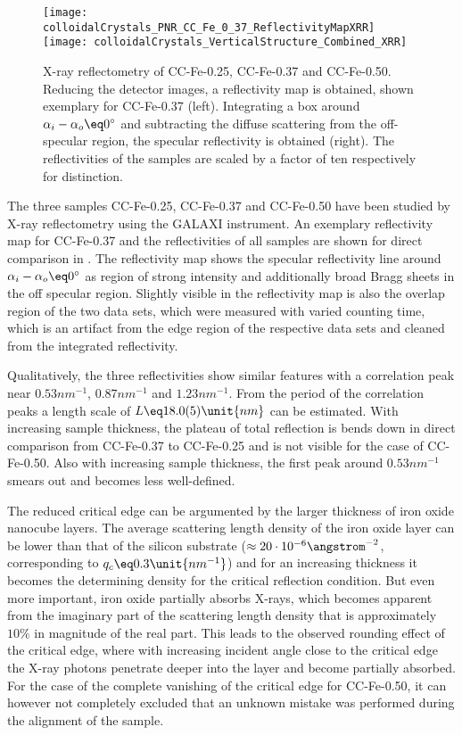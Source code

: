 \documentclass[\main/dresen_thesis.tex]{subfiles}
\begin{document}
  \label{sec:colloidalCrystals:layers:xrr}
  \begin{figure}[tb]
    \centering
    \texttt{[image: colloidalCrystals\_PNR\_CC\_Fe\_0\_37\_ReflectivityMapXRR]}
    \texttt{[image: colloidalCrystals\_VerticalStructure\_Combined\_XRR]}
    \caption{\label{fig:colloidalCrystals:xrr}X-ray reflectometry of CC-Fe-0.25, CC-Fe-0.37 and CC-Fe-0.50. Reducing the detector images, a reflectivity map is obtained, shown exemplary for CC-Fe-0.37 (left). Integrating a box around $\alpha_i - \alpha_o \eq 0 ^\circ$ and subtracting the diffuse scattering from the off-specular region, the specular reflectivity is obtained (right). The reflectivities of the samples are scaled by a factor of ten respectively for distinction.}
  \end{figure}

  The three samples CC-Fe-0.25, CC-Fe-0.37 and CC-Fe-0.50 have been studied by X-ray reflectometry using the GALAXI instrument.
  An exemplary reflectivity map for CC-Fe-0.37 and the reflectivities of all samples are shown for direct comparison in .
  The reflectivity map shows the specular reflectivity line around $\alpha_i - \alpha_o \eq 0 ^\circ$ as region of strong intensity and additionally broad Bragg sheets in the off specular region.
  Slightly visible in the reflectivity map is also the overlap region of the two data sets, which were measured with varied counting time, which is an artifact from the edge region of the respective data sets and cleaned from the integrated reflectivity.

  Qualitatively, the three reflectivities show similar features with a correlation peak near $0.53 \unit{nm^{-1}}$, $0.87 \unit{nm^{-1}}$ and $1.23 \unit{nm^{-1}}$.
  From the period of the correlation peaks a length scale of $L \eq 18.0(5) \unit{nm}$ can be estimated.
  With increasing sample thickness, the plateau of total reflection is bends down in direct comparison from CC-Fe-0.37 to CC-Fe-0.25 and is not visible for the case of CC-Fe-0.50.
  Also with increasing sample thickness, the first peak around $0.53 \unit{nm^{-1}}$ smears out and becomes less well-defined.

  The reduced critical edge can be argumented by the larger thickness of iron oxide nanocube layers.
  The average scattering length density of the iron oxide layer can be lower than that of the silicon substrate ($\approx 20 \cdot 10^{-6} \angstrom^{-2}$, corresponding to $q_c \eq 0.3 \unit{nm^{-1}}$) and for an increasing thickness it becomes the determining density for the critical reflection condition.
  But even more important, iron oxide partially absorbs X-rays, which becomes apparent from the imaginary part of the scattering length density that is approximately $10 \%$ in magnitude of the real part.
  This leads to the observed rounding effect of the critical edge, where with increasing incident angle close to the critical edge the X-ray photons penetrate deeper into the layer and become partially absorbed.
  For the case of the complete vanishing of the critical edge for CC-Fe-0.50, it can however not completely excluded that an unknown mistake was performed during the alignment of the sample.
\end{document}
